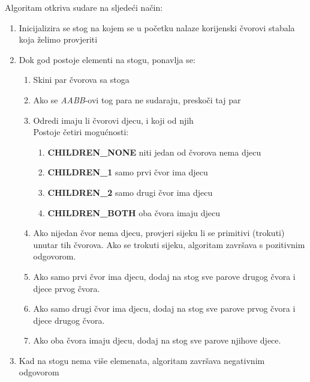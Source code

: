\pagebreak
Algoritam otkriva sudare na sljedeći način:
\begin{enumerate}
  \item Inicijalizira se stog na kojem se u početku nalaze korijenski čvorovi stabala koja želimo provjeriti
  \item Dok god postoje elementi na stogu, ponavlja se:

  \begin{enumerate}[2.1.]
    \item Skini par čvorova sa stoga
    \item Ako se \textit{AABB}-ovi tog para ne sudaraju, preskoči taj par
    \item Odredi imaju li čvorovi djecu, i koji od njih\\
    Postoje četiri mogućnosti:
    \begin{enumerate}
        \item \textbf{CHILDREN\_NONE} niti jedan od čvorova nema djecu
        \item \textbf{CHILDREN\_1} samo prvi čvor ima djecu
        \item \textbf{CHILDREN\_2} samo drugi čvor ima djecu
        \item \textbf{CHILDREN\_BOTH} oba čvora imaju djecu
    \end{enumerate}
    \item Ako nijedan čvor nema djecu, provjeri sijeku li se primitivi (trokuti) unutar tih čvorova. Ako se trokuti sijeku, algoritam završava s pozitivnim odgovorom.
    \item Ako samo prvi čvor ima djecu, dodaj na stog sve parove drugog čvora i djece prvog čvora.
    \item Ako samo drugi čvor ima djecu, dodaj na stog sve parove prvog čvora i djece drugog čvora.
    \item Ako oba čvora imaju djecu, dodaj na stog sve parove njihove djece.
  \end{enumerate}
  \item Kad na stogu nema više elemenata, algoritam završava negativnim odgovorom
\end{enumerate}